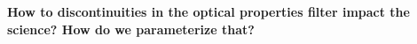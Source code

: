 \textbf{How to discontinuities in the optical properties filter impact the science? How do we parameterize that?}



